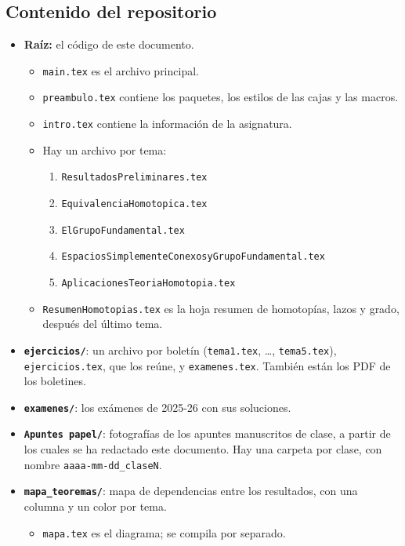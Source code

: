 \subsection*{Contenido del repositorio}
\begin{itemize}
    \item \textbf{Raíz:} el código de este documento.
    \begin{itemize}
        \item \texttt{main.tex} es el archivo principal.
        \item \texttt{preambulo.tex} contiene los paquetes, los estilos de las cajas y las macros.
        \item \texttt{intro.tex} contiene la información de la asignatura.
        \item Hay un archivo por tema:
        \begin{enumerate}
            \item \texttt{ResultadosPreliminares.tex}
            \item \texttt{EquivalenciaHomotopica.tex}
            \item \texttt{ElGrupoFundamental.tex}
            \item \texttt{EspaciosSimplementeConexosyGrupoFundamental.tex}
            \item \texttt{AplicacionesTeoriaHomotopia.tex}
        \end{enumerate}
        \item \texttt{ResumenHomotopias.tex} es la hoja resumen de homotopías, lazos y grado, después del último tema.
    \end{itemize}
    \item \textbf{\texttt{ejercicios/}}: un archivo por boletín (\texttt{tema1.tex}, \dots, \texttt{tema5.tex}), \texttt{ejercicios.tex}, que los reúne, y \texttt{examenes.tex}. También están los PDF de los boletines.
    \item \textbf{\texttt{examenes/}}: los exámenes de 2025-26 con sus soluciones.
    \item \textbf{\texttt{Apuntes papel/}}: fotografías de los apuntes manuscritos de clase, a partir de los cuales se ha redactado este documento. Hay una carpeta por clase, con nombre \texttt{aaaa-mm-dd\_claseN}.
    \item \textbf{\texttt{mapa\_teoremas/}}: mapa de dependencias entre los resultados, con una columna y un color por tema.
    \begin{itemize}
        \item \texttt{mapa.tex} es el diagrama; se compila por separado.

\end{itemize}
\end{itemize}
